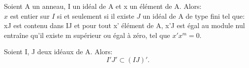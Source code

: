 \begin{maproposition}
	Soient A un anneau, I un idéal de A et x un élément de A. Alors:\\
	$x$ est entier sur $I$ si et seulement si il existe $J$ un idéal de A de type fini tel que: xJ est contenu dans IJ et pour tout x' élément de A, x'J est égal au module nul entraîne qu'il existe m supérieur ou égal à zéro, tel que $x'x^m = 0$.
\end{maproposition}
\begin{moncorollaire}
	Soient I, J deux idéaux de A. Alors:
	\[ I'J' \subset (IJ)'.\]
\end{moncorollaire}


